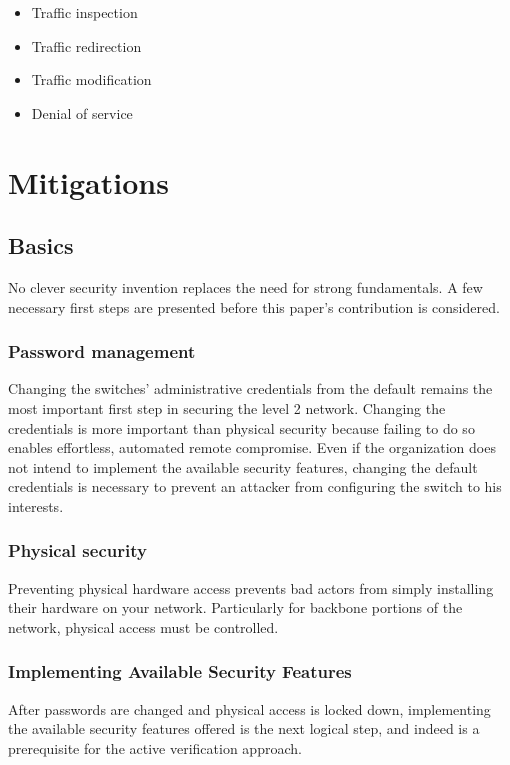 \documentclass[journal]{IEEEtran}
\begin{document}
\begin{itemize}
  \item Traffic inspection
  \item Traffic redirection
  \item Traffic modification
  \item Denial of service
\end{itemize}

\section{Mitigations}

\subsection{Basics}
No clever security invention replaces the need for strong fundamentals. A few necessary first steps
are presented before this paper's contribution is considered.

\subsubsection{Password management}
Changing the switches' administrative credentials from the default remains the most important first
step in securing the level 2 network. Changing the credentials is more important than physical
security because failing to do so enables effortless, automated remote compromise. Even if the
organization does not intend to implement the available security features, changing the default
credentials is necessary to prevent an attacker from configuring the switch to his interests.

\subsubsection{Physical security}
Preventing physical hardware access prevents bad actors from simply installing their hardware on
your network. Particularly for backbone portions of the network, physical access must be controlled.

\subsubsection{Implementing Available Security Features}
After passwords are changed and physical access is locked down, implementing the available security
features offered is the next logical step, and indeed is a prerequisite for the active verification
approach.
\end{document}

